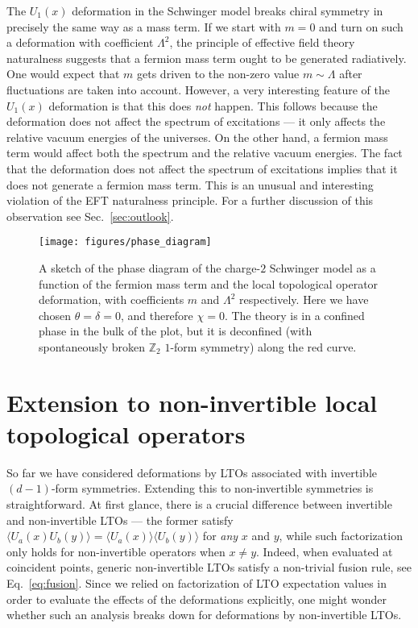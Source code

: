 \documentclass[11pt]{article}
\begin{document}
The $U_1(x)$ deformation in the Schwinger model breaks chiral symmetry in precisely the same way as a mass term.  If we start with $m=0$ and turn on such a deformation with coefficient $\Lambda^2$, the principle of effective field theory naturalness suggests that a fermion mass term ought to be generated radiatively.  One would expect that  $m$ gets driven to the non-zero value $m\sim \Lambda$ after fluctuations are taken into account.  However, a very interesting feature of the $U_1(x)$ deformation is that this does \emph{not} happen.  This follows because the deformation does not affect the spectrum of excitations --- it only affects the relative vacuum energies of the universes.  On the other hand, a fermion mass term would affect both the spectrum and the relative vacuum energies.  The fact that the deformation does not affect the spectrum of excitations implies that it does not generate a fermion mass term. This is an unusual and interesting violation of the EFT  naturalness principle.  For a further discussion of this observation see Sec.~\ref{sec:outlook}.

\begin{figure}[t]
\centering
\texttt{[image: figures/phase\_diagram]}
\caption{A sketch of the phase diagram of the charge-$2$ Schwinger model as a function of the fermion mass term and the local topological operator deformation, with coefficients $m$ and $\Lambda^2$ respectively. Here we have chosen $\theta=\delta=0$, and therefore $\chi=0$. The theory is in a confined phase in the bulk of the plot, but it is deconfined (with spontaneously broken $\mathbb{Z}_2$ $1$-form symmetry) along the red curve.} 
\label{fig:Schwinger_phase_diagram} 
\end{figure}


\section{Extension to non-invertible local topological operators}
\label{sec:non_inv}

So far we have considered deformations by LTOs associated with invertible $(d-1)$-form symmetries. Extending this to non-invertible symmetries is straightforward. At first glance, there is a crucial difference between invertible and non-invertible LTOs --- the former satisfy $\langle U_a(x)U_b(y)\rangle = \langle U_a(x)\rangle\langle U_b(y)\rangle$ for \emph{any} $x$ and $y$, while such factorization only holds for non-invertible operators when $x \not=y$. Indeed, when evaluated at coincident points, generic non-invertible LTOs satisfy a non-trivial fusion rule, see Eq.~\eqref{eq:fusion}. Since we relied on factorization of LTO expectation values in order to evaluate the effects of the deformations explicitly, one might wonder whether such an analysis breaks down for deformations by non-invertible LTOs. 
\end{document}
